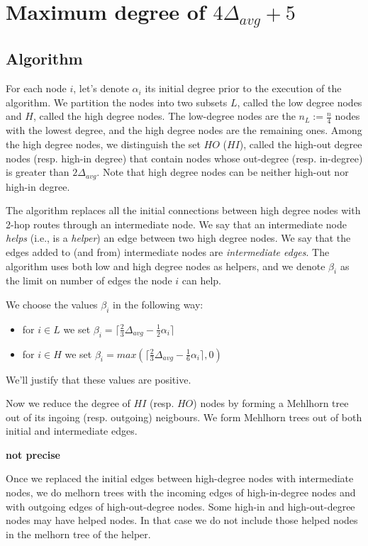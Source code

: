 \documentclass{article}
\begin{document}
\section{Maximum degree of $4\Delta_{avg} + 5$}

\subsection{Algorithm}

For each node $i$, let's denote $\alpha_i$ its initial degree prior to the execution of 
the algorithm.
We partition the nodes into two subsets $L$, called the low degree nodes and $H$, called
the high degree nodes. The low-degree nodes are
the $n_L := \frac{n}{4}$ nodes with the lowest degree, and the high degree nodes
are the remaining ones.
Among the high degree nodes, we distinguish the set $HO$ ($HI$), called the high-out degree nodes (resp. high-in degree) that contain nodes whose out-degree (resp. in-degree) is greater than
$2\Delta_{avg}$.
Note that high degree nodes can be neither high-out nor high-in degree.

The algorithm replaces all the initial connections between high degree nodes with 2-hop routes through an intermediate node.
We say that an intermediate node \emph{helps} (i.e., is a \emph{helper}) an edge between two high degree nodes.
We say that the edges added to (and from) intermediate nodes are \emph{intermediate edges}.
The algorithm uses both low and high degree nodes as helpers, and we denote
$\beta_i$ as the limit on number of edges the node $i$ can help.

We choose the values $\beta_i$ in the following way:
\begin{itemize}
  \item for $i \in L$ we set
  $\beta_i = \lceil\frac{2}{3}\Delta_{avg}-\frac{1}{2}\alpha_i\rceil$
  \item for $i \in H$ we set
  $\beta_i = max(\lceil\frac{2}{3}\Delta_{avg}-\frac{1}{6}\alpha_i\rceil, 0)$
\end{itemize}
We'll justify that these values are positive.

Now we reduce the degree of $HI$ (resp. $HO$) nodes by forming a Mehlhorn tree out of its ingoing (resp. outgoing) neigbours.
We form Mehlhorn trees out of both initial and intermediate edges.

\textbf{not precise}


Once we replaced the initial edges between high-degree nodes with intermediate nodes,
we do melhorn trees with the incoming edges of high-in-degree
nodes and with outgoing edges of high-out-degree nodes.
Some high-in and high-out-degree nodes may have helped nodes.
In that case we do not include those helped nodes in the melhorn tree of the helper.
\end{document}
